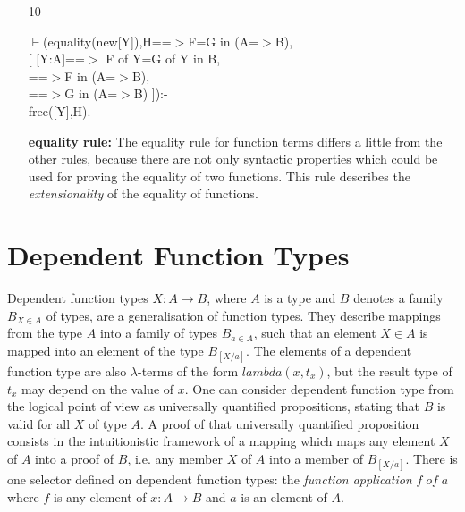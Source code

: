 \documentclass[11pt]{report}
\newcommand{\inv}[1]{\index{#1}}
\begin{document}
\begin{enumerate}
 \item[10]
\begin{sf}\begin{tabbing}
$\vdash$(equality(new[Y]),H==$>$F=G in (A=$>$B),\\[-0.15ex]
\hspace{2em}[ [Y:A]==$>$ F of Y=G of Y in B, \\[-0.15ex]
\hspace{3em}==$>$F in (A=$>$B), \\[-0.15ex]
\hspace{3em}==$>$G in (A=$>$B) ]):-\\[-0.15ex]
\hspace{2em}free([Y],H).
\end{tabbing}\end{sf}

 {\bf equality rule:}
 The equality rule for function terms differs a little from 
 the other rules, because there are not only syntactic
 properties which could be used for proving the equality of
 two functions. This rule describes the \emph{extensionality}
 of the equality of functions.
  
 \end{enumerate}
  
 \section{Dependent Function Types}
 \inv{dependent function type}
 Dependent function types $X:A\rightarrow B$, where $A$ is a type and
 $B$ denotes a family $B_{X\in A}$ of types,
 are a generalisation of function types. 
 They describe mappings from the type $A$ into a family
 of types $B_{a\in A}$, such that an element $X\in A$ is mapped
 into an element of the type $B_{[X/a]}$.
 The elements of a dependent function type are also $\lambda$-terms
 of the form $lambda(x,t_x)$, but the result type of $t_x$ may depend
 on the value of $x$.
 One can consider dependent function type from the logical point
 of view as universally quantified propositions, stating that $B$ is
 valid for all $X$ of type $A$.
 A proof of that universally quantified proposition consists in the
 intuitionistic framework of a mapping which maps any element $X$
 of $A$ into a proof of $B$, i.e. any member $X$ of $A$ into a member
 of $B_{[X/a]}$.
 There is one selector defined on dependent function types: 
 the \emph{function application} $f\;of\;a$ where 
 $f$ is any element of $x:A\rightarrow B$
 and $a$ is an element of $A$.
  
\end{document}
